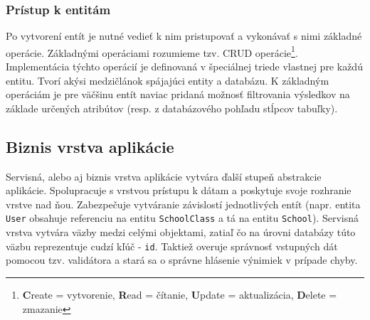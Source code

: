 \documentclass[12pt,oneside]{fithesis2}
\begin{document}
			\subsubsection{Prístup k entitám}
	\par Po vytvorení entít je nutné vedieť k nim pristupovať a vykonávať s nimi základné operácie. Základnými operáciami rozumieme tzv. CRUD operácie\footnote{\textbf{C}reate = vytvorenie, \textbf{R}ead = čítanie, \textbf{U}pdate = aktualizácia, \textbf{D}elete = zmazanie}. Implementácia týchto operácií je definovaná v špeciálnej triede vlastnej pre každú entitu. Tvorí akýsi medzičlánok spájajúci entity a databázu. K základným operáciám je pre väčšinu entít naviac pridaná možnosť filtrovania výsledkov na základe určených atribútov (resp. z databázového pohľadu stĺpcov tabuľky).

      	\subsection{Biznis vrstva aplikácie}
      
      \par Servisná, alebo aj biznis vrstva aplikácie vytvára ďalší stupeň abstrakcie aplikácie. Spolupracuje s vrstvou prístupu k dátam a poskytuje svoje rozhranie vrstve nad ňou. Zabezpečuje vytváranie závislostí jednotlivých entít (napr. entita \texttt{User} obsahuje referenciu na entitu \texttt{SchoolClass} a tá na entitu \texttt{School}). Servisná vrstva vytvára väzby medzi celými objektami, zatiaľ čo na úrovni databázy túto väzbu reprezentuje cudzí kľúč - \texttt{id}. Taktiež overuje správnosť vstupných dát pomocou tzv. validátora a stará sa o správne hlásenie výnimiek v prípade chyby.
      
\end{document}
